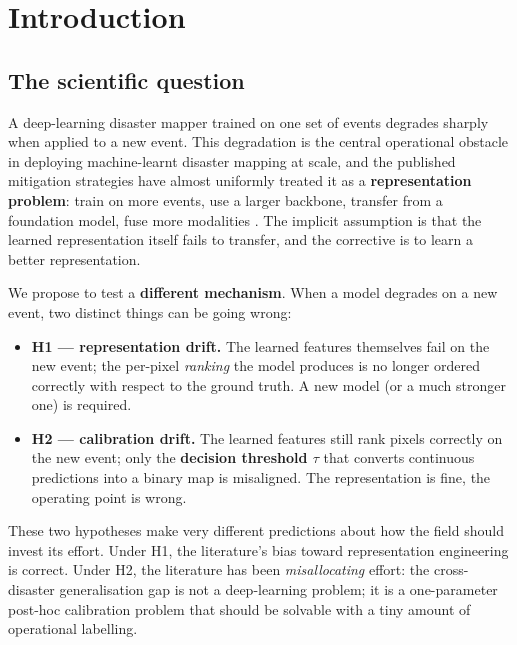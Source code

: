 \section{Introduction}\label{introduction}

\subsection{The scientific question}\label{the-scientific-question}

A deep-learning disaster mapper trained on one set of events degrades
sharply when applied to a new event. This degradation is the central
operational obstacle in deploying machine-learnt disaster mapping at
scale, and the published mitigation strategies have almost uniformly
treated it as a \textbf{representation problem}: train on more events, use a
larger backbone, transfer from a foundation model, fuse more modalities
\cite{brown2024alphaearth,jakubik2023prithvi,xiong2024dofa}. The implicit assumption is that the learned representation
itself fails to transfer, and the corrective is to learn a better
representation.

We propose to test a \textbf{different mechanism}. When a model degrades on a
new event, two distinct things can be going wrong:

\begin{itemize}
\tightlist
\item
  \textbf{H1 --- representation drift.} The learned features themselves fail
  on the new event; the per-pixel \emph{ranking} the model produces is no
  longer ordered correctly with respect to the ground truth. A new model
  (or a much stronger one) is required.
\item
  \textbf{H2 --- calibration drift.} The learned features still rank pixels
  correctly on the new event; only the \textbf{decision threshold $\tau$} that
  converts continuous predictions into a binary map is misaligned. The
  representation is fine, the operating point is wrong.
\end{itemize}

These two hypotheses make very different predictions about how the field
should invest its effort. Under H1, the literature's bias toward
representation engineering is correct. Under H2, the literature has been
\emph{misallocating} effort: the cross-disaster generalisation gap is not a
deep-learning problem; it is a one-parameter post-hoc calibration
problem that should be solvable with a tiny amount of operational
labelling.

